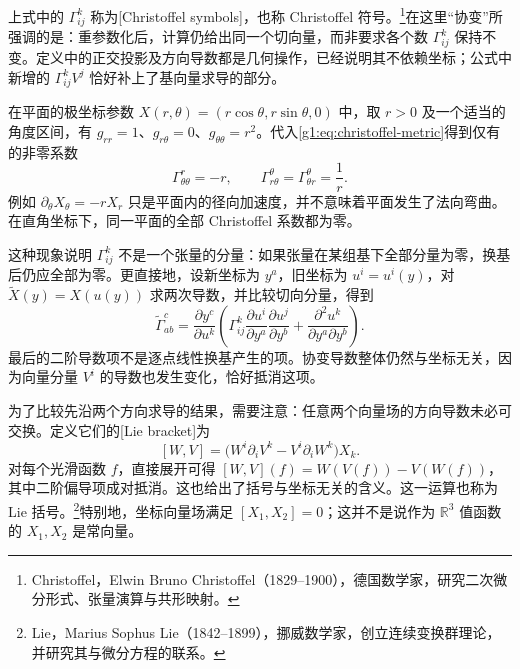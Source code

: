 上式中的 \(\Gamma^k_{ij}\) 称为[Christoffel symbols]，也称 Christoffel 符号。\footnote{Christoffel，Elwin Bruno Christoffel（1829--1900），德国数学家，研究二次微分形式、张量演算与共形映射。}在这里“协变”所强调的是：重参数化后，计算仍给出同一个切向量，而非要求各个数 \(\Gamma^k_{ij}\) 保持不变。定义中的正交投影及方向导数都是几何操作，已经说明其不依赖坐标；公式中新增的 \(\Gamma^k_{ij}V^j\) 恰好补上了基向量求导的部分。

\begin{example}
	\label{g1:exm:polar-christoffel}
	在平面的极坐标参数 \(X(r,\theta)=(r\cos\theta,r\sin\theta,0)\) 中，取 \(r>0\) 及一个适当的角度区间，有 \(g_{rr}=1\)、\(g_{r\theta}=0\)、\(g_{\theta\theta}=r^2\)。代入\eqref{g1:eq:christoffel-metric}得到仅有的非零系数
	\[
		\Gamma^r_{\theta\theta}=-r,\qquad
		\Gamma^\theta_{r\theta}=\Gamma^\theta_{\theta r}=\frac1r.
	\]
	例如 \(\partial_\theta X_\theta=-rX_r\) 只是平面内的径向加速度，并不意味着平面发生了法向弯曲。在直角坐标下，同一平面的全部 Christoffel 系数都为零。
\end{example}

这种现象说明 \(\Gamma^k_{ij}\) 不是一个张量的分量：如果张量在某组基下全部分量为零，换基后仍应全部为零。更直接地，设新坐标为 \(y^a\)，旧坐标为 \(u^i=u^i(y)\)，对 \(\widetilde X(y)=X(u(y))\) 求两次导数，并比较切向分量，得到
\[
	\widetilde\Gamma^c_{ab}
	=\frac{\partial y^c}{\partial u^k}
	\left(
		\Gamma^k_{ij}\frac{\partial u^i}{\partial y^a}\frac{\partial u^j}{\partial y^b}
		+\frac{\partial^2u^k}{\partial y^a\partial y^b}
	\right).
\]
最后的二阶导数项不是逐点线性换基产生的项。协变导数整体仍然与坐标无关，因为向量分量 \(V^i\) 的导数也发生变化，恰好抵消这项。

\ProseParagraphBreak

为了比较先沿两个方向求导的结果，需要注意：任意两个向量场的方向导数未必可交换。定义它们的[Lie bracket]为
\[
	[W,V]=\bigl(W^i\partial_iV^k-V^i\partial_iW^k\bigr)X_k.
\]
对每个光滑函数 \(f\)，直接展开可得 \([W,V](f)=W(V(f))-V(W(f))\)，其中二阶偏导项成对抵消。这也给出了括号与坐标无关的含义。这一运算也称为 Lie 括号。\footnote{Lie，Marius Sophus Lie（1842--1899），挪威数学家，创立连续变换群理论，并研究其与微分方程的联系。}特别地，坐标向量场满足 \([X_1,X_2]=0\)；这并不是说作为 \(\mathbb R^3\) 值函数的 \(X_1,X_2\) 是常向量。

